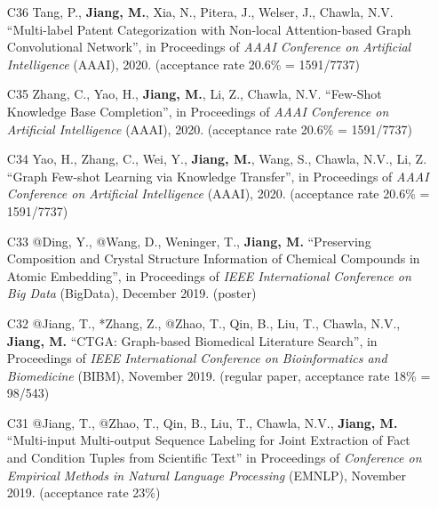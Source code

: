 \documentclass[10pt]{article}
\newenvironment{myindentpar}[1]%
{\begin{list}{}%
         {\setlength{\leftmargin}{#1}}%
         \item[]%
}
{\end{list}}
\newcounter{list}
\newcommand{\hide}[1]{}
\begin{document}
\begin{myindentpar}{0.00cm}
\begin{enumerate}[leftmargin=.5cm]
\item[C36] Tang, P., \textbf{Jiang, M.}, Xia, N., Pitera, J., Welser, J., Chawla, N.V. ``Multi-label Patent Categorization with Non-local Attention-based Graph Convolutional Network'', in Proceedings of \textit{AAAI Conference on Artificial Intelligence} (AAAI), 2020. (acceptance rate 20.6\% = 1591/7737)
	
\item[C35] Zhang, C., Yao, H., \textbf{Jiang, M.}, Li, Z., Chawla, N.V. ``Few-Shot Knowledge Base Completion'', in Proceedings of \textit{AAAI Conference on Artificial Intelligence} (AAAI), 2020. (acceptance rate 20.6\% = 1591/7737)

\item[C34] Yao, H., Zhang, C., Wei, Y., \textbf{Jiang, M.}, Wang, S., Chawla, N.V., Li, Z. ``Graph Few-shot Learning via Knowledge Transfer'', in Proceedings of \textit{AAAI Conference on Artificial Intelligence} (AAAI), 2020. (acceptance rate 20.6\% = 1591/7737)

\item[C33] @Ding, Y., @Wang, D., Weninger, T., \textbf{Jiang, M.} ``Preserving Composition and Crystal Structure Information of Chemical Compounds in Atomic Embedding'', in Proceedings of \textit{IEEE International Conference on Big Data} (BigData), December 2019. (poster)

\item[C32] @Jiang, T., *Zhang, Z., @Zhao, T., Qin, B., Liu, T., Chawla, N.V., \textbf{Jiang, M.} ``CTGA: Graph-based Biomedical Literature Search'', in Proceedings of \textit{IEEE International Conference on Bioinformatics and Biomedicine} (BIBM), November 2019. (regular paper, acceptance rate 18\% = 98/543)

	\hide{\vspace{-0.1cm}\hspace{0.5cm}{\small \emph{I made 20\% contribution and Mr. Jiang made 60\%. I conceived the idea. Mr. Jiang implemented the system, did the experiments, and wrote the paper.}}}

\item[C31] @Jiang, T., @Zhao, T., Qin, B., Liu, T., Chawla, N.V., \textbf{Jiang, M.} ``Multi-input Multi-output Sequence Labeling for Joint Extraction of Fact and Condition Tuples from Scientific Text'' in Proceedings of \textit{Conference on Empirical Methods in Natural Language Processing} (EMNLP), November 2019. (acceptance rate 23\%)

	\hide{\vspace{-0.1cm}\hspace{0.5cm}{\small \emph{I made 30\% contribution and Mr. Jiang made 60\%. I conceived the idea. Mr. Jiang designed the study, implemented the system, and did the experiments. I wrote the introduction. Mr. Jiang wrote the rest of the paper.}}}


\end{enumerate}
\end{myindentpar}
\end{document}
